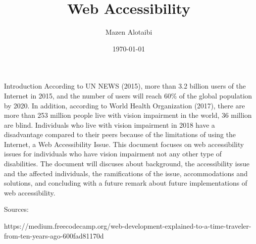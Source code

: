 \documentclass[11pt, titlepage]{article}
\title{\sffamily \huge \textbf{Web Accessibility}} \let\Title\@title
\author{\sffamily \Large Mazen Alotaibi} \let\Author\@author
\date{\sffamily \large \today} \let\Date\@date
\newenvironment{index_me} {
	\begin{adjustwidth}{2cm}{}
}{\end{adjustwidth}}
\newenvironment{cite_figure}[1]
{
	See \textbf{Figure #1}
}{}
\newenvironment{add_figure}[4]{
  \begin{figure}[h]
    \centering \sffamily
    \texttt{[image: \#1]}
    \textbf{\fontsize{11.5}{11.5} \caption{#2}}
    #3 \textit{#4}
  \end{figure}
}{}
\newenvironment{doc_heading}[1]
{
     \section*{\sffamily \LARGE \capitalisewords{#1}}
}{}
\newenvironment{doc_subheading}[1]
{
	\begin{index_me}
    \subsection*{\sffamily\Large \capitalisewords{#1}}
}{\end{index_me}}
\begin{document}
\maketitle

\iffalse
Random citation \cite{WEBSITE:1} embeddeed in text. gggg
Random citation \cite{DUMMY:1} embeddeed in text.
  \begin{doc_subheading}{subsection}
  \end{doc_subheading}
\begin{cite_figure}{1} \end{cite_figure}

\begin{add_figure}
    {}
    {addadaad}
    {lol}
    {mazen}
\end{add_figure}



https://news.un.org/en/story/2015/11/516862-some-32-billion-people-now-online-number-still-falls-short-internet-target-un
\fi

\begin{doc_heading}{Introduction}
According to UN NEWS (2015), more than 3.2 billion users of the Internet in 2015, and the number of users will reach 60\% of the global population by 2020. In addition, according to World Health Organization (2017), there are more than 253 million people live with vision impairment in the world, 36 million are blind. Individuals who live with vision impairment in 2018 have a disadvantage compared to their peers because of the limitations of using the Internet, a Web Accessibility Issue. This document focuses on web accessibility issues for individuals who have vision impairment not any other type of disabilities. The document will discuses about background, the accessibility issue and the affected individuals, the ramifications of the issue, accommodations and solutions, and concluding with a future remark about future implementations of web accessibility.
\end{doc_heading}




\iffalse
Sources:

https://medium.freecodecamp.org/web-development-explained-to-a-time-traveler-from-ten-years-ago-600fad81170d
\end{document}
